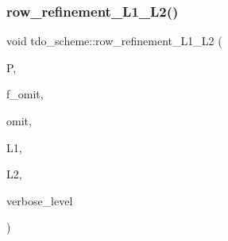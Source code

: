 \mbox{\label{classtdo__scheme_a0e9219a94a8ac92ceb2d4aeb42200ad6}} 
\subsubsection{\texorpdfstring{row\+\_\+refinement\+\_\+\+L1\+\_\+\+L2()}{row\_refinement\_L1\_L2()}}
{\footnotesize\ttfamily void tdo\+\_\+scheme\+::row\+\_\+refinement\+\_\+\+L1\+\_\+\+L2 (\begin{DoxyParamCaption}\item[{\mbox{\hyperlink{classpartitionstack}{partitionstack}} \&}]{P,  }\item[{\mbox{\hyperlink{galois_8h_a09fddde158a3a20bd2dcadb609de11dc}{I\+NT}}}]{f\+\_\+omit,  }\item[{\mbox{\hyperlink{galois_8h_a09fddde158a3a20bd2dcadb609de11dc}{I\+NT}}}]{omit,  }\item[{\mbox{\hyperlink{galois_8h_a09fddde158a3a20bd2dcadb609de11dc}{I\+NT}} \&}]{L1,  }\item[{\mbox{\hyperlink{galois_8h_a09fddde158a3a20bd2dcadb609de11dc}{I\+NT}} \&}]{L2,  }\item[{\mbox{\hyperlink{galois_8h_a09fddde158a3a20bd2dcadb609de11dc}{I\+NT}}}]{verbose\+\_\+level }\end{DoxyParamCaption})}

\mbox{\label{classtdo__scheme_a64ef9682a147f9bb50fa23063e9d9f1c}} 
